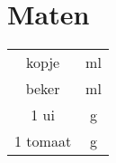 \section{Maten}

\begin{tabular}{|c|c|}
    \hline
    \unit[1]{kopje} & \unit[150]{ml} \\
    \unit[1]{beker} & \unit[180]{ml} \\
    1 ui &  \unit[75]{g} \\
    1 tomaat & \unit[70]{g} \\
    \hline
\end{tabular}